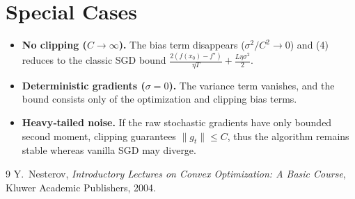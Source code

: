 \documentclass{article}
\begin{document}
\section*{Special Cases}
\begin{itemize}
\item \textbf{No clipping ($C\to\infty$).}
    The bias term disappears ($\sigma^{2}/C^{2}\to0$) and (4) reduces to the
    classic SGD bound $\frac{2(f(x_{0})-f^{\star})}{\eta T}
    +\frac{L\eta\sigma^{2}}{2}$.

\item \textbf{Deterministic gradients ($\sigma=0$).}
    The variance term vanishes, and the bound consists only of the
    optimization and clipping bias terms.

\item \textbf{Heavy‑tailed noise.}
    If the raw stochastic gradients have only bounded second moment,
    clipping guarantees $\|g_t\|\le C$, thus the algorithm remains stable
    whereas vanilla SGD may diverge.
\end{itemize}

\begin{thebibliography}{9}
Y.~Nesterov, \emph{Introductory Lectures on Convex Optimization:
  A Basic Course}, Kluwer Academic Publishers, 2004.
\end{thebibliography}
\end{document}
